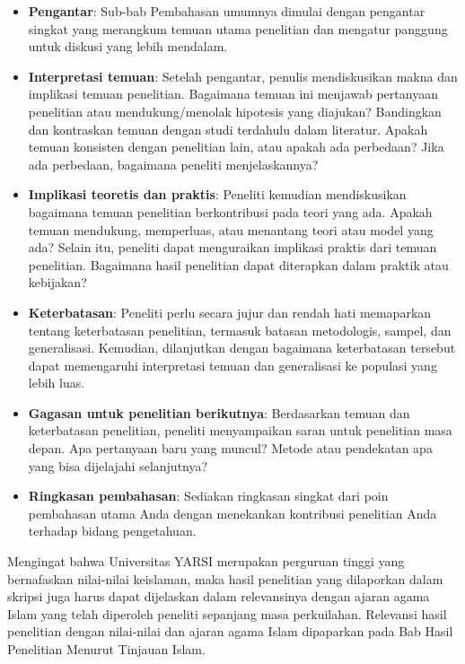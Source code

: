 \documentclass[
  indonesian,
  letterpaper,
]{scrbook}
\providecommand{\tightlist}{%
  \setlength{\itemsep}{0pt}\setlength{\parskip}{0pt}}
\begin{document}
\begin{itemize}
\tightlist
\item
  \textbf{Pengantar}: Sub-bab Pembahasan umumnya dimulai dengan
  pengantar singkat yang merangkum temuan utama penelitian dan mengatur
  panggung untuk diskusi yang lebih mendalam.
\item
  \textbf{Interpretasi temuan}: Setelah pengantar, penulis mendiskusikan
  makna dan implikasi temuan penelitian. Bagaimana temuan ini menjawab
  pertanyaan penelitian atau mendukung/menolak hipotesis yang diajukan?
  Bandingkan dan kontraskan temuan dengan studi terdahulu dalam
  literatur. Apakah temuan konsisten dengan penelitian lain, atau apakah
  ada perbedaan? Jika ada perbedaan, bagaimana peneliti menjelaskannya?
\item
  \textbf{Implikasi teoretis dan praktis}: Peneliti kemudian
  mendiskusikan bagaimana temuan penelitian berkontribusi pada teori
  yang ada. Apakah temuan mendukung, memperluas, atau menantang teori
  atau model yang ada? Selain itu, peneliti dapat menguraikan implikasi
  praktis dari temuan penelitian. Bagaimana hasil penelitian dapat
  diterapkan dalam praktik atau kebijakan?
\item
  \textbf{Keterbatasan}: Peneliti perlu secara jujur dan rendah hati
  memaparkan tentang keterbatasan penelitian, termasuk batasan
  metodologis, sampel, dan generalisasi. Kemudian, dilanjutkan dengan
  bagaimana keterbatasan tersebut dapat memengaruhi interpretasi temuan
  dan generalisasi ke populasi yang lebih luas.
\item
  \textbf{Gagasan untuk penelitian berikutnya}: Berdasarkan temuan dan
  keterbatasan penelitian, peneliti menyampaikan saran untuk penelitian
  masa depan. Apa pertanyaan baru yang muncul? Metode atau pendekatan
  apa yang bisa dijelajahi selanjutnya?
\item
  \textbf{Ringkasan pembahasan}: Sediakan ringkasan singkat dari poin
  pembahasan utama Anda dengan menekankan kontribusi penelitian Anda
  terhadap bidang pengetahuan.
\end{itemize}

Mengingat bahwa Universitas YARSI merupakan perguruan tinggi yang
bernafaskan nilai-nilai keislaman, maka hasil penelitian yang dilaporkan
dalam skripsi juga harus dapat dijelaskan dalam relevansinya dengan
ajaran agama Islam yang telah diperoleh peneliti sepanjang masa
perkuilahan. Relevansi hasil penelitian dengan nilai-nilai dan ajaran
agama Islam dipaparkan pada Bab Hasil Penelitian Menurut Tinjauan Islam.
\end{document}
